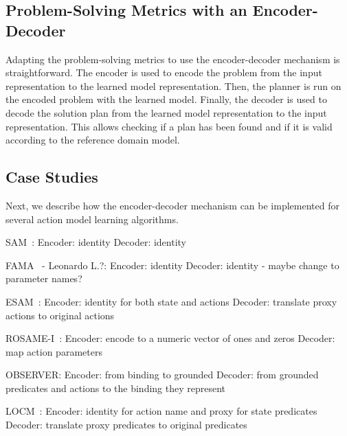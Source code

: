 \documentclass{article}
\theoremstyle{definition}
\theoremstyle{remark}
\newcommand{\realm}{{\ensuremath{M^*}}\xspace}
\newif\ifaddcomments
\newcommand{\roni}[1]{\ifaddcomments{\textcolor{red}{[Roni: #1]}}\fi}
\newcommand{\yarin}[1]{\ifaddcomments{\textcolor{teal}{[Yarin: #1]}}\fi}
\begin{document}
\subsection{Problem-Solving Metrics with an Encoder-Decoder}

Adapting the problem-solving metrics to use the encoder-decoder mechanism is straightforward.
The encoder is used to encode the problem from the input representation to the learned model representation. 
Then, the planner is run on the encoded problem with the learned model. 
Finally, the decoder is used to decode the solution plan from the learned model representation to the input representation. 
This allows checking if a plan has been found and if it is valid according to the reference domain model. 


\subsection{Case Studies}

Next, we describe how the encoder-decoder mechanism can be implemented for several action model learning algorithms. \yarin{Some action model learning algorithms operate directly in the original input representation $R_{\realm}$, without transforming the state or action spaces. For these algorithms, the learned model uses the same symbols and structure as the input data. As such, there is no need for additional encoding or decoding: the identity function suffices for both.}

SAM~\citep{stern2017efficient}\yarin{or is ut juba2021safe ?}: \roni{Either me or someone from my group will write this one}
Encoder: identity
Decoder: identity

FAMA~\citep{aineto2019learning} - Leonardo L.?:
Encoder: identity
Decoder: identity - maybe change to parameter names?

ESAM~\citep{juba2021safe}: \roni{Either me or someone from my group will write this one}
Encoder: identity for both state and actions     
Decoder: translate proxy actions to original actions

ROSAME-I~\citep{xi2024neuro}: \roni{Maybe Yarin or Argaman can help with this one}
Encoder: encode to a numeric vector of ones and zeros
Decoder: map action parameters

OBSERVER\yarin{add cite}: \roni{Anyone can help here?}
Encoder: from binding to grounded
Decoder: from grounded predicates and actions to the binding they represent

LOCM~\citep{cresswell2013acquiring}:\yarin{I will complete this}
Encoder: identity for action name and proxy for state predicates
Decoder: translate proxy predicates to original predicates
\end{document}
